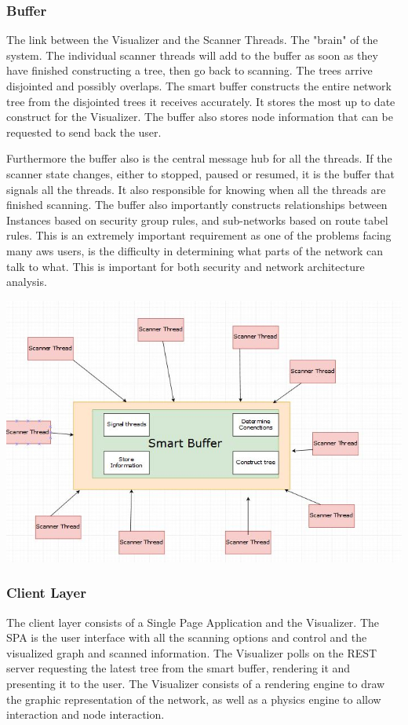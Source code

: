 \documentclass[hidelinks,a4paper,12pt]{article}
\begin{document}
\subsubsection{Buffer}
The link between the Visualizer and the Scanner Threads. The "brain" of the system. The individual scanner threads will add to the buffer as soon as they have finished constructing a tree, then go back to scanning. The trees arrive disjointed and possibly overlaps. The smart buffer constructs the entire network tree from the disjointed trees it receives accurately. It stores the most up to date construct for the Visualizer. The buffer also stores node information that can be requested to send back the user.

Furthermore the buffer also is the central message hub for all the threads. If the scanner state changes, either to stopped, paused or resumed, it is the buffer that signals all the threads. It also responsible for knowing when all the threads are finished scanning. The buffer also importantly constructs relationships between Instances based on security group rules, and sub-networks based on route tabel rules. This is an extremely important requirement as one of the problems facing many aws users, is the difficulty in determining what parts of the network can talk to what. This is important for both security and network architecture analysis.



\includegraphics[width=1.00\textwidth]{./images/buffer.jpg}\\[0.4cm] 

\subsubsection{Client Layer}
The client layer consists of a Single Page Application and the Visualizer. The SPA is the user interface with all the scanning options and control and the visualized graph and scanned information. The Visualizer polls on the REST server requesting the latest tree from the smart buffer, rendering it and presenting it to the user. The Visualizer consists of a rendering engine to draw the graphic representation of the network, as well as a physics engine to allow interaction and node interaction. 
\end{document}
